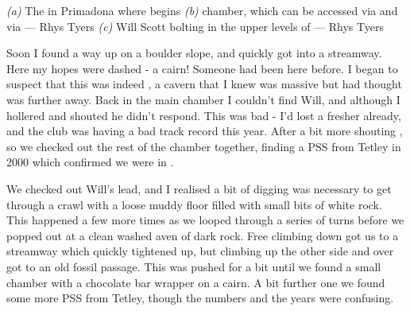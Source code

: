 \begin{pagefigure}
	\checkoddpage \ifoddpage \forcerectofloat \else \forceversofloat \fi
	\centering
	
   	\begin{subfigure}[t]{0.49\textwidth}
    	\centering
       	\caption{} \label{The spiral climb}
    \end{subfigure}
    \hfill
	\begin{subfigure}[t]{0.49\textwidth}
		\centering
		 \caption{}\label{Alkatraz}
	\end{subfigure}
    \vspace{0cm}
	
	\begin{subfigure}[h]{\textwidth}
		\centering
		\caption{}\label{WS bolting}
	\end{subfigure}

         \caption{
   		\emph{(a)} The \protect{} in Primadona where \protect{} begins
     		\emph{(b)} \protect{} chamber, which can be accessed via \protect{} and \protect{} via \protect{} --- Rhys Tyers 
     		\emph{(c)} Will Scott bolting in the upper levels of \protect{} --- Rhys Tyers
		}
\end{pagefigure}

Soon I found a way up on a boulder slope, and quickly got into a streamway. Here my hopes were dashed - a cairn! Someone had been here before. I began to suspect that this was indeed , a cavern that I knew was massive but had thought was further away. Back in the main chamber I couldn’t find Will, and although I hollered and shouted he didn’t respond. This was bad - I’d lost a fresher already, and the club was having a bad track record this year. After a bit more shouting , so we checked out the rest of the chamber together, finding a PSS from Tetley in 2000 which confirmed we were in .

We checked out Will’s lead, and I realised a bit of digging was necessary to get through a crawl with a loose muddy floor filled with small bits of white rock. This happened a few more times as we looped through a series of turns before we popped out at a clean washed aven of dark rock. Free climbing down got us to a streamway which quickly tightened up, but climbing up the other side and over got to an old fossil passage. This was pushed for a bit until we found a small chamber with a chocolate bar wrapper on a cairn. A bit further one we found some more PSS from Tetley, though the numbers and the years were confusing.

